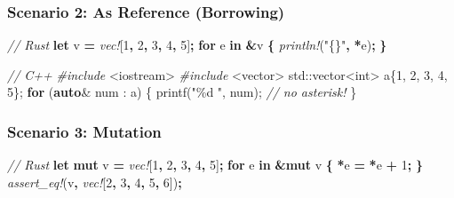 \documentclass[
]{book}
\newenvironment{Shaded}{\begin{snugshade}}{\end{snugshade}}
\newcommand{\BuiltInTok}[1]{#1}
\newcommand{\CommentTok}[1]{\textcolor[rgb]{0.56,0.35,0.01}{\textit{#1}}}
\newcommand{\ControlFlowTok}[1]{\textcolor[rgb]{0.13,0.29,0.53}{\textbf{#1}}}
\newcommand{\DataTypeTok}[1]{\textcolor[rgb]{0.13,0.29,0.53}{#1}}
\newcommand{\DecValTok}[1]{\textcolor[rgb]{0.00,0.00,0.81}{#1}}
\newcommand{\ImportTok}[1]{#1}
\newcommand{\KeywordTok}[1]{\textcolor[rgb]{0.13,0.29,0.53}{\textbf{#1}}}
\newcommand{\NormalTok}[1]{#1}
\newcommand{\OperatorTok}[1]{\textcolor[rgb]{0.81,0.36,0.00}{\textbf{#1}}}
\newcommand{\PreprocessorTok}[1]{\textcolor[rgb]{0.56,0.35,0.01}{\textit{#1}}}
\newcommand{\SpecialCharTok}[1]{\textcolor[rgb]{0.00,0.00,0.00}{#1}}
\newcommand{\StringTok}[1]{\textcolor[rgb]{0.31,0.60,0.02}{#1}}
\begin{document}
\hypertarget{scenario-2-as-reference-borrowing}{%
\subsubsection{Scenario 2: As Reference (Borrowing)}\label{scenario-2-as-reference-borrowing}}

\begin{Shaded}
\begin{Highlighting}[]
\CommentTok{// Rust}
\KeywordTok{let}\NormalTok{ v }\OperatorTok{=} \PreprocessorTok{vec!}\NormalTok{[}\DecValTok{1}\OperatorTok{,} \DecValTok{2}\OperatorTok{,} \DecValTok{3}\OperatorTok{,} \DecValTok{4}\OperatorTok{,} \DecValTok{5}\NormalTok{]}\OperatorTok{;}
\KeywordTok{for}\NormalTok{ e }\KeywordTok{in} \OperatorTok{\&}\NormalTok{v }\OperatorTok{\{}
    \PreprocessorTok{println!}\NormalTok{(}\StringTok{"\{\}"}\OperatorTok{,} \OperatorTok{*}\NormalTok{e)}\OperatorTok{;}
\OperatorTok{\}}
\end{Highlighting}
\end{Shaded}

\begin{Shaded}
\begin{Highlighting}[]
\CommentTok{// C++}
\PreprocessorTok{\#include }\ImportTok{\textless{}iostream\textgreater{}}
\PreprocessorTok{\#include }\ImportTok{\textless{}vector\textgreater{}}
\BuiltInTok{std::}\NormalTok{vector\textless{}}\DataTypeTok{int}\NormalTok{\textgreater{} a\{}\DecValTok{1}\NormalTok{, }\DecValTok{2}\NormalTok{, }\DecValTok{3}\NormalTok{, }\DecValTok{4}\NormalTok{, }\DecValTok{5}\NormalTok{\};}
\ControlFlowTok{for}\NormalTok{ (}\KeywordTok{auto}\NormalTok{\& num : a)}
\NormalTok{\{}
\NormalTok{    printf(}\StringTok{"}\SpecialCharTok{\%d}\StringTok{ "}\NormalTok{, num); }\CommentTok{// no asterisk!}
\NormalTok{\}}
\end{Highlighting}
\end{Shaded}

\hypertarget{scenario-3-mutation}{%
\subsubsection{Scenario 3: Mutation}\label{scenario-3-mutation}}

\begin{Shaded}
\begin{Highlighting}[]
\CommentTok{// Rust}
\KeywordTok{let} \KeywordTok{mut}\NormalTok{ v }\OperatorTok{=} \PreprocessorTok{vec!}\NormalTok{[}\DecValTok{1}\OperatorTok{,} \DecValTok{2}\OperatorTok{,} \DecValTok{3}\OperatorTok{,} \DecValTok{4}\OperatorTok{,} \DecValTok{5}\NormalTok{]}\OperatorTok{;}
\KeywordTok{for}\NormalTok{ e }\KeywordTok{in} \OperatorTok{\&}\KeywordTok{mut}\NormalTok{ v }\OperatorTok{\{}
    \OperatorTok{*}\NormalTok{e }\OperatorTok{=} \OperatorTok{*}\NormalTok{e }\OperatorTok{+} \DecValTok{1}\OperatorTok{;}
\OperatorTok{\}}
\PreprocessorTok{assert\_eq!}\NormalTok{(v}\OperatorTok{,} \PreprocessorTok{vec!}\NormalTok{[}\DecValTok{2}\OperatorTok{,} \DecValTok{3}\OperatorTok{,} \DecValTok{4}\OperatorTok{,} \DecValTok{5}\OperatorTok{,} \DecValTok{6}\NormalTok{])}\OperatorTok{;}
\end{Highlighting}
\end{Shaded}
\end{document}
